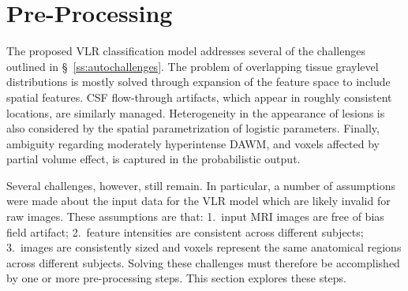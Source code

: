 \chapter{Pre-Processing}\label{ch-pre}
The proposed VLR classification model addresses
several of the challenges outlined in \S~\ref{ss:autochallenges}.
The problem of overlapping tissue graylevel distributions
is mostly solved through expansion of the feature space to include spatial features.
CSF flow-through artifacts, which appear in roughly consistent locations, are similarly managed.
Heterogeneity in the appearance of lesions is also considered
by the spatial parametrization of logistic parameters.
Finally, ambiguity regarding moderately hyperintense DAWM,
and voxels affected by partial volume effect,
is captured in the probabilistic output.
\par
Several challenges, however, still remain.
In particular, a number of assumptions were made about the input data for the VLR model
which are likely invalid for raw images.
These assumptions are that:
1.\ input MRI images are free of bias field artifact;
2.\ feature intensities are consistent across different subjects;
3.\ images are consistently sized and
voxels represent the same anatomical regions across different subjects.
Solving these challenges must therefore be accomplished by one or more pre-processing steps.
This section explores these steps.

